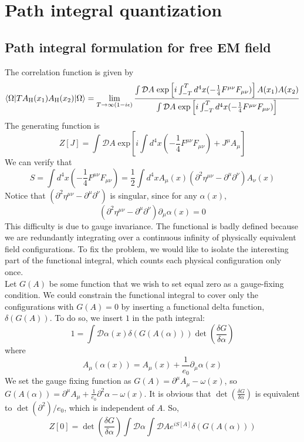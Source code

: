\section{Path integral quantization}
\subsection{Path integral formulation for free EM field}
\noindent
The correlation function is given by
\[\langle \Omega | T A_{\rm H}(x_1) A_{\rm H}(x_2)| \Omega \rangle = \lim_{T \to \infty(1-i\epsilon)} \frac{\int \mathcal{D}A \; \mathrm{exp} \left[ i\int_{-T}^T d^4x (-\frac{1}{4} F^{\mu\nu}F_{\mu\nu}) \right] A(x_1) A(x_2)}{\int \mathcal{D}A \; \mathrm{exp} \left[ i\int_{-T}^T d^4x (-\frac{1}{4} F^{\mu\nu}F_{\mu\nu}) \right]}\]
The generating function is 
\[Z[J] = \int \mathcal{D}A \; \mathrm{exp} \left[ i\int d^4x (-\frac{1}{4} F^{\mu\nu}F_{\mu\nu}) + J^{\mu} A_{\mu} \right]\]
We can verify that
\[S = \int d^4x (-\frac{1}{4} F^{\mu\nu}F_{\mu\nu}) = \frac{1}{2} \int d^4x A_{\mu}(x) (\partial^2\eta^{\mu\nu} - \partial^{\mu}\partial^{\nu})A_{\nu}(x)\]
Notice that $(\partial^2\eta^{\mu\nu} - \partial^{\mu}\partial^{\nu})$ is singular, since for any $\alpha(x)$, 
\[(\partial^2\eta^{\mu\nu} - \partial^{\mu}\partial^{\nu})\partial_{\mu}\alpha(x) = 0\]
This difficulty is due to gauge invariance. 
The functional is badly defined because we are redundantly integrating over a continuous infinity of physically equivalent field configurations. To fix the problem, we would like to isolate the interesting part of the functional integral, which counts each physical configuration only once. 
\\
Let $G(A)$ be some function that we wish to set equal zero as a gauge-fixing condition. We could constrain the functional integral to cover only the configurations with $G(A) = 0$ by inserting a functional delta function, $\delta(G(A))$. To do so, we insert $1$ in the path integral:
\[ 1 = \int \mathcal{D}\alpha(x) \delta(G(A(\alpha))) \det \left( \frac{\delta G}{\delta \alpha} \right)\]
where
\[A_{\mu}(\alpha(x)) = A_{\mu}(x) + \frac{1}{e_0}\partial_{\mu}\alpha(x)\]
We set the gauge fixing function as $G(A) = \partial^{\mu} A_{\mu} -\omega(x)$, so $G(A(\alpha)) = \partial^{\mu} A_{\mu} + \frac{1}{e_0}\partial^2 \alpha - \omega(x)$. It is obvious that $\det \left( \frac{\delta G}{\delta \alpha} \right)$ is equivalent to $\det(\partial^2)/e_0$, which is independent of $A$. So,
\[Z[0] = \det \left( \frac{\delta G}{\delta \alpha} \right) \int \mathcal{D}\alpha \int \mathcal{D}A e^{iS[A]} \delta(G(A(\alpha)))\]
